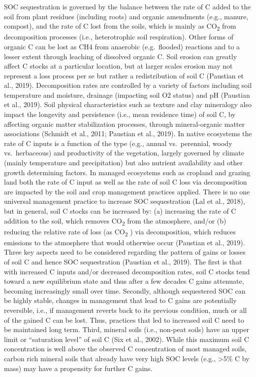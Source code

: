 \documentclass[
  10pt,
  b5paper,
]{book}
\begin{document}
SOC sequestration is governed by the balance between the rate of C added to the soil from plant residues (including roots) and organic amendments (e.g., manure, compost), and the rate of C lost from the soils, which is mainly as CO\textsubscript{2} from decomposition processes (i.e., heterotrophic soil respiration). Other forms of organic C can be lost as CH4 from anaerobic (e.g.~flooded) reactions and to a lesser extent through leaching of dissolved organic C. Soil erosion can greatly affect C stocks at a particular location, but at larger scales erosion may not represent a loss process per se but rather a redistribution of soil C (Paustian et al., 2019).
Decomposition rates are controlled by a variety of factors including soil temperature and moisture, drainage (impacting soil O2 status) and pH (Paustian et al., 2019). Soil physical characteristics such as texture and clay mineralogy also impact the longevity and persistence (i.e., mean residence time) of soil C, by affecting organic matter stabilization processes, through mineral-organic matter associations (Schmidt et al., 2011; Paustian et al., 2019). In native ecosystems the rate of C inputs is a function of the type (e.g., annual vs.~perennial, woody vs.~herbaceous) and productivity of the vegetation, largely governed by climate (mainly temperature and precipitation) but also nutrient availability and other growth determining factors. In managed ecosystems such as cropland and grazing land both the rate of C input as well as the rate of soil C loss via decomposition are impacted by the soil and crop management practices applied. There is no one universal management practice to increase SOC sequestration (Lal et al., 2018), but in general, soil C stocks can be increased by: (a) increasing the rate of C addition to the soil, which removes CO\textsubscript{2} from the atmosphere, and/or (b) reducing the relative rate of loss (as CO\textsubscript{2} ) via decomposition, which reduces emissions to the atmosphere that would otherwise occur (Paustian et al., 2019).
Three key aspects need to be considered regarding the pattern of gains or losses of soil C and hence SOC sequestration (Paustian et al., 2019). The first is that with increased C inputs and/or decreased decomposition rates, soil C stocks tend toward a new equilibrium state and thus after a few decades C gains attenuate, becoming increasingly small over time. Secondly, although sequestered SOC can be highly stable, changes in management that lead to C gains are potentially reversible, i.e., if management reverts back to its previous condition, much or all of the gained C can be lost. Thus, practices that led to increased soil C need to be maintained long term. Third, mineral soils (i.e., non-peat soils) have an upper limit or ``saturation level'' of soil C (Six et al., 2002). While this maximum soil C concentration is well above the observed C concentration of most managed soils, carbon rich mineral soils that already have very high SOC levels (e.g., \textgreater5\% C by mass) may have a propensity for further C gains.
\end{document}
